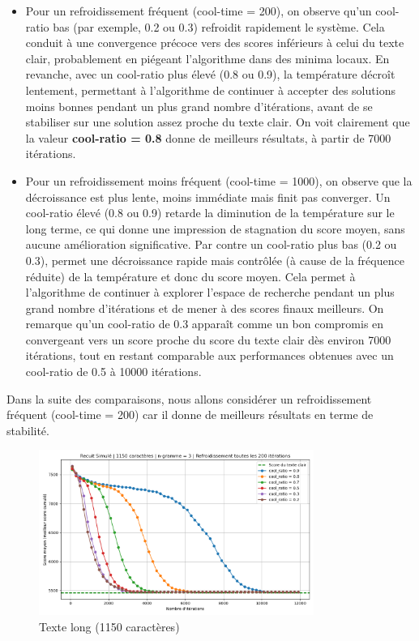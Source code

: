 \documentclass[a4paper]{article}
\begin{document}
\begin{itemize}
    \item Pour un refroidissement fréquent (cool-time = 200), on observe qu'un cool-ratio bas (par exemple, 0.2 ou 0.3) refroidit rapidement le système. Cela conduit à une convergence précoce vers des scores inférieurs à celui du texte clair, probablement en piégeant l'algorithme dans des minima locaux. 
          En revanche, avec un cool-ratio plus élevé (0.8 ou 0.9), la température décroît lentement, permettant à l’algorithme de continuer à accepter des solutions moins bonnes pendant un plus grand nombre d’itérations, avant de se stabiliser sur une solution assez proche du texte clair. 
          On voit clairement que la valeur \textbf{cool-ratio = 0.8} donne de meilleurs résultats, à partir de 7000 itérations.
    \item Pour un refroidissement moins fréquent (cool-time = 1000), on observe que la décroissance est plus lente, moins immédiate mais finit pas converger. Un cool-ratio élevé (0.8 ou 0.9) retarde la diminution de la température sur le long terme, ce qui donne une impression de stagnation du score moyen, sans aucune amélioration significative.
          Par contre un cool-ratio plus bas (0.2 ou 0.3), permet une décroissance rapide mais contrôlée (à cause de la fréquence réduite) de la température et donc du score moyen. Cela permet à l'algorithme de continuer à explorer l'espace de recherche pendant un plus grand nombre d'itérations et de mener à des scores finaux meilleurs. 
          On remarque qu'un cool-ratio de 0.3 apparaît comme un bon compromis en convergeant vers un score proche du score du texte clair dès environ 7000 itérations, tout en restant comparable aux performances obtenues avec un cool-ratio de 0.5 à 10000 itérations.
\end{itemize}

Dans la suite des comparaisons, nous allons considérer un refroidissement fréquent (cool-time = 200) car il donne de meilleurs résultats en terme de stabilité.

\begin{figure}[H]
    \centering
    \includegraphics[width=0.8\textwidth, keepaspectratio, height=0.6\textheight]{graphe_recuit_n_3_1150_cool_time_200.png}
    \caption{Texte long (1150 caractères)}
    \label{fig:n3-110-1000}
\end{figure}
\end{document}
